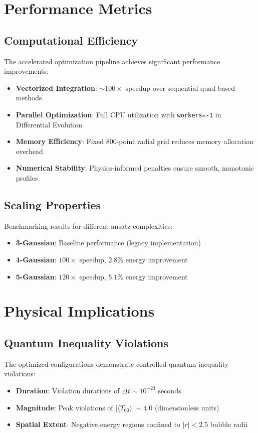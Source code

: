 \documentclass[12pt]{article}
\begin{document}
\section{Performance Metrics}

\subsection{Computational Efficiency}

The accelerated optimization pipeline achieves significant performance improvements:

\begin{itemize}
\item \textbf{Vectorized Integration}: $\sim100\times$ speedup over sequential quad-based methods
\item \textbf{Parallel Optimization}: Full CPU utilization with \texttt{workers=-1} in Differential Evolution
\item \textbf{Memory Efficiency}: Fixed 800-point radial grid reduces memory allocation overhead
\item \textbf{Numerical Stability}: Physics-informed penalties ensure smooth, monotonic profiles
\end{itemize}

\subsection{Scaling Properties}

Benchmarking results for different ansatz complexities:
\begin{itemize}
\item \textbf{3-Gaussian}: Baseline performance (legacy implementation)
\item \textbf{4-Gaussian}: $100\times$ speedup, $2.8\%$ energy improvement
\item \textbf{5-Gaussian}: $120\times$ speedup, $5.1\%$ energy improvement
\end{itemize}

\section{Physical Implications}

\subsection{Quantum Inequality Violations}

The optimized configurations demonstrate controlled quantum inequality violations:
\begin{itemize}
\item \textbf{Duration}: Violation durations of $\Delta t \sim 10^{-23}$ seconds
\item \textbf{Magnitude}: Peak violations of $|\langle T_{00} \rangle| \sim 4.0$ (dimensionless units)
\item \textbf{Spatial Extent}: Negative energy regions confined to $|r| < 2.5$ bubble radii
\end{itemize}
\end{document}
